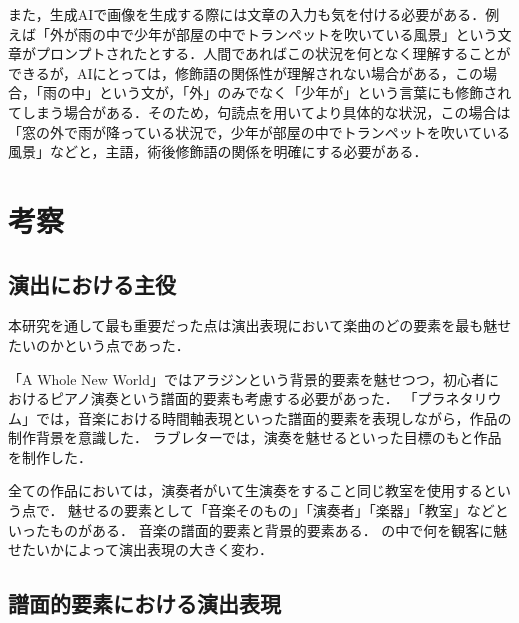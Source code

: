 また，生成AIで画像を生成する際には文章の入力も気を付ける必要がある．例えば「外が雨の中で少年が部屋の中でトランペットを吹いている風景」という文章がプロンプトされたとする．人間であればこの状況を何となく理解することができるが，AIにとっては，修飾語の関係性が理解されない場合がある，この場合，「雨の中」という文が，「外」のみでなく「少年が」という言葉にも修飾されてしまう場合がある．そのため，句読点を用いてより具体的な状況，この場合は「窓の外で雨が降っている状況で，少年が部屋の中でトランペットを吹いている風景」などと，主語，術後修飾語の関係を明確にする必要がある．


\section{考察}
\subsection{演出における主役}
本研究を通して最も重要だった点は演出表現において楽曲のどの要素を最も魅せたいのかという点であった．


「A Whole New World」ではアラジンという背景的要素を魅せつつ，初心者におけるピアノ演奏という譜面的要素も考慮する必要があった．
「プラネタリウム」では，音楽における時間軸表現といった譜面的要素を表現しながら，作品の制作背景を意識した．
ラブレターでは，演奏を魅せるといった目標のもと作品を制作した．

全ての作品においては，演奏者がいて生演奏をすること同じ教室を使用するという点で．
魅せるの要素として「音楽そのもの」「演奏者」「楽器」「教室」などといったものがある．
音楽の譜面的要素と背景的要素ある．
の中で何を観客に魅せたいかによって演出表現の大きく変わ．



\subsection{譜面的要素における演出表現}

